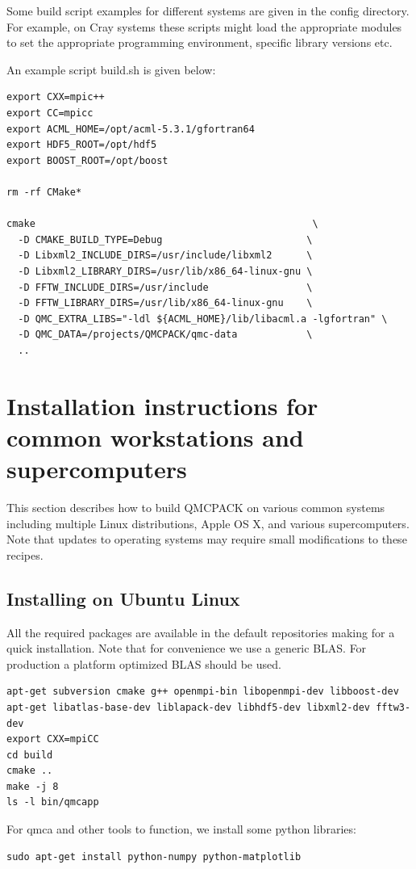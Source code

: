 Some build script examples for different systems are given in the
config directory. For example, on Cray systems these scripts might
load the appropriate modules to set the appropriate programming
environment, specific library versions etc.

An example script build.sh is given below:
\begin{verbatim}
export CXX=mpic++
export CC=mpicc
export ACML_HOME=/opt/acml-5.3.1/gfortran64
export HDF5_ROOT=/opt/hdf5
export BOOST_ROOT=/opt/boost

rm -rf CMake*

cmake                                                \
  -D CMAKE_BUILD_TYPE=Debug                         \
  -D Libxml2_INCLUDE_DIRS=/usr/include/libxml2      \
  -D Libxml2_LIBRARY_DIRS=/usr/lib/x86_64-linux-gnu \
  -D FFTW_INCLUDE_DIRS=/usr/include                 \
  -D FFTW_LIBRARY_DIRS=/usr/lib/x86_64-linux-gnu    \
  -D QMC_EXTRA_LIBS="-ldl ${ACML_HOME}/lib/libacml.a -lgfortran" \
  -D QMC_DATA=/projects/QMCPACK/qmc-data            \
  ..
\end{verbatim}

\section{Installation instructions for common workstations and
  supercomputers}
\label{sec:installexamples}
This section describes how to build QMCPACK on various common systems
including multiple Linux distributions, Apple OS X, and various
supercomputers. Note that updates to operating systems may require
small modifications to these recipes.
\subsection{Installing on Ubuntu Linux}

All the required packages are available in the
default repositories making for a quick installation. Note that for
convenience we use a generic BLAS. For production a platform optimized BLAS should be used.

\begin{verbatim}
apt-get subversion cmake g++ openmpi-bin libopenmpi-dev libboost-dev
apt-get libatlas-base-dev liblapack-dev libhdf5-dev libxml2-dev fftw3-dev
export CXX=mpiCC
cd build
cmake ..
make -j 8
ls -l bin/qmcapp
\end{verbatim}

For qmca and other tools to function, we install some python libraries:
\begin{verbatim}
sudo apt-get install python-numpy python-matplotlib
\end{verbatim}

